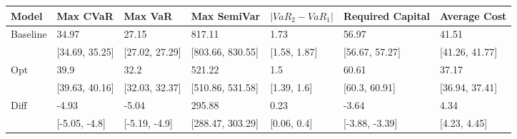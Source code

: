 \begin{tabular}{lllllll}
\toprule
   Model &       Max CVaR &        Max VaR &      Max SemiVar & $|VaR_2 - VaR_1|$ & Required Capital &   Average Cost \\
\midrule
Baseline &          34.97 &          27.15 &           817.11 &              1.73 &            56.97 &          41.51 \\
         & [34.69, 35.25] & [27.02, 27.29] & [803.66, 830.55] &      [1.58, 1.87] &   [56.67, 57.27] & [41.26, 41.77] \\
     Opt &           39.9 &           32.2 &           521.22 &               1.5 &            60.61 &          37.17 \\
         & [39.63, 40.16] & [32.03, 32.37] & [510.86, 531.58] &       [1.39, 1.6] &    [60.3, 60.91] & [36.94, 37.41] \\
    Diff &          -4.93 &          -5.04 &           295.88 &              0.23 &            -3.64 &           4.34 \\
         &  [-5.05, -4.8] &  [-5.19, -4.9] & [288.47, 303.29] &       [0.06, 0.4] &   [-3.88, -3.39] &   [4.23, 4.45] \\
\bottomrule
\end{tabular}
